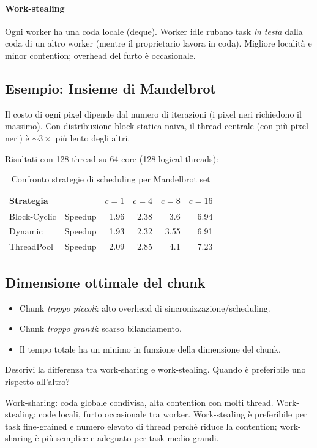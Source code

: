 \documentclass[11pt,a4paper]{article}
\theoremstyle{remark}
\newenvironment{esercizio}[1][]{%
  \begin{tcolorbox}[breakable,title={\textbf{Esercizio / Domanda d'esame}\ifx&#1&\else: #1\fi},
    colback=yellow!5!white, colframe=orange!75!black, fonttitle=\small\bfseries]%
}{%
  \end{tcolorbox}%
}
\newenvironment{risposta}{%
  \begin{tcolorbox}[breakable,title={\textbf{Risposta}},
    colback=green!5!white, colframe=green!50!black, fonttitle=\small\bfseries]%
}{%
  \end{tcolorbox}%
}
\begin{document}
\paragraph{Work-stealing}
Ogni worker ha una coda locale (deque). Worker idle rubano task \emph{in testa} dalla coda di un altro worker (mentre il proprietario lavora in coda). Migliore località e minor contention; overhead del furto è occasionale.

\subsection{Esempio: Insieme di Mandelbrot}

Il costo di ogni pixel dipende dal numero di iterazioni (i pixel neri richiedono il massimo). Con distribuzione block statica naiva, il thread centrale (con più pixel neri) è $\sim3\times$ più lento degli altri.

Risultati con 128 thread su 64-core (128 logical threads):
\begin{table}[H]
\centering
\begin{tabular}{llrrrr}
\toprule
Strategia & & $c=1$ & $c=4$ & $c=8$ & $c=16$ \\
\midrule
Block-Cyclic & Speedup & 1.96 & 2.38 & 3.6 & 6.94 \\
Dynamic & Speedup & 1.93 & 2.32 & 3.55 & 6.91 \\
ThreadPool & Speedup & 2.09 & 2.85 & 4.1 & 7.23 \\
\bottomrule
\end{tabular}
\caption{Confronto strategie di scheduling per Mandelbrot set}
\end{table}

\subsection{Dimensione ottimale del chunk}

\begin{itemize}
  \item Chunk \emph{troppo piccoli}: alto overhead di sincronizzazione/scheduling.
  \item Chunk \emph{troppo grandi}: scarso bilanciamento.
  \item Il tempo totale ha un minimo in funzione della dimensione del chunk.
\end{itemize}

\begin{esercizio}
Descrivi la differenza tra work-sharing e work-stealing. Quando è preferibile uno rispetto all'altro?
\end{esercizio}
\begin{risposta}
Work-sharing: coda globale condivisa, alta contention con molti thread. Work-stealing: code locali, furto occasionale tra worker. Work-stealing è preferibile per task fine-grained e numero elevato di thread perché riduce la contention; work-sharing è più semplice e adeguato per task medio-grandi.
\end{risposta}
\end{document}
